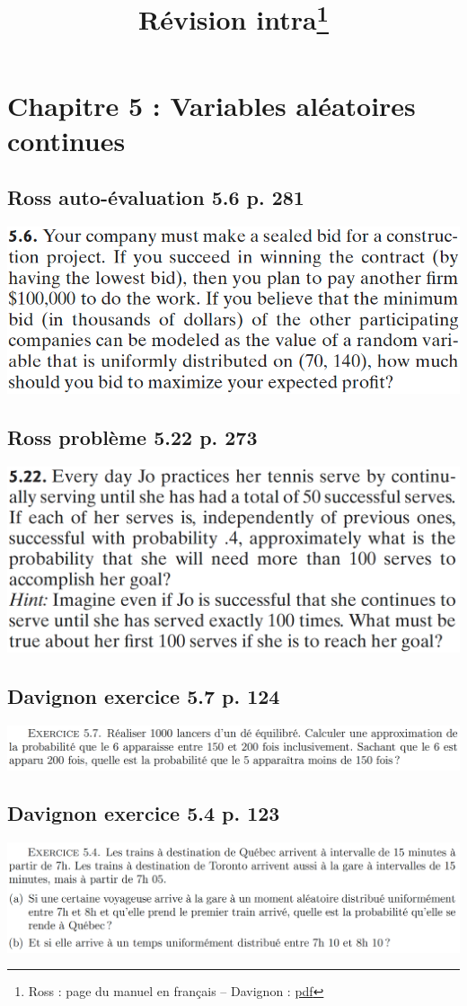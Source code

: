\documentclass[11pt]{article}
\title{Révision intra\thanks{Ross : page du manuel en français -- Davignon : \href{https://dms.umontreal.ca/~davignon/MAT1720/notes_de_cours.pdf}{pdf}}}
\date{}
\begin{document}
	\maketitle
	\tableofcontents
	\newpage
	
	\section{Chapitre 5 : Variables aléatoires continues}
	\subsection{Ross auto-évaluation 5.6 p. 281}
	\includegraphics[width=.7\linewidth]{a5_6_p281}
	\newpage
	
	\subsection{Ross problème 5.22 p. 273}
	\includegraphics[width=.7\linewidth]{p5_22_p273}
	\newpage
	
	\subsection{Davignon exercice 5.7 p. 124}
	\includegraphics[width=\linewidth]{dvg_5_7_p124}
	\newpage
	
	\subsection{Davignon exercice 5.4 p. 123}
	\includegraphics[width=\linewidth]{dvg_5_4_p123}
	\newpage
	
\end{document}
